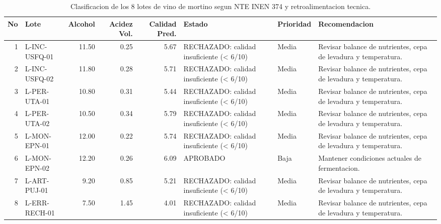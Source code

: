 \begin{table}
\centering
\begin{tabular}{rlrrrlll}
  \toprule
No & Lote & Alcohol & Acidez Vol. & Calidad Pred. & Estado & Prioridad & Recomendacion \\ 
  \midrule
  1 & L-INC-USFQ-01 & 11.50 & 0.25 & 5.67 & RECHAZADO: calidad insuficiente (< 6/10) & Media & Revisar balance de nutrientes, cepa de levadura y temperatura. \\ 
    2 & L-INC-USFQ-02 & 11.80 & 0.28 & 5.71 & RECHAZADO: calidad insuficiente (< 6/10) & Media & Revisar balance de nutrientes, cepa de levadura y temperatura. \\ 
    3 & L-PER-UTA-01 & 10.80 & 0.31 & 5.44 & RECHAZADO: calidad insuficiente (< 6/10) & Media & Revisar balance de nutrientes, cepa de levadura y temperatura. \\ 
    4 & L-PER-UTA-02 & 10.50 & 0.34 & 5.79 & RECHAZADO: calidad insuficiente (< 6/10) & Media & Revisar balance de nutrientes, cepa de levadura y temperatura. \\ 
    5 & L-MON-EPN-01 & 12.00 & 0.22 & 5.74 & RECHAZADO: calidad insuficiente (< 6/10) & Media & Revisar balance de nutrientes, cepa de levadura y temperatura. \\ 
    6 & L-MON-EPN-02 & 12.20 & 0.26 & 6.09 & APROBADO & Baja & Mantener condiciones actuales de fermentacion. \\ 
    7 & L-ART-PUJ-01 & 9.20 & 0.85 & 5.21 & RECHAZADO: calidad insuficiente (< 6/10) & Media & Revisar balance de nutrientes, cepa de levadura y temperatura. \\ 
    8 & L-ERR-RECH-01 & 7.50 & 1.45 & 4.01 & RECHAZADO: calidad insuficiente (< 6/10) & Media & Revisar balance de nutrientes, cepa de levadura y temperatura. \\ 
   \bottomrule
\end{tabular}
\caption{Clasificacion de los 8 lotes de vino de mortino segun NTE INEN 374 y retroalimentacion tecnica.} 
\label{tab:inen}
\end{table}
